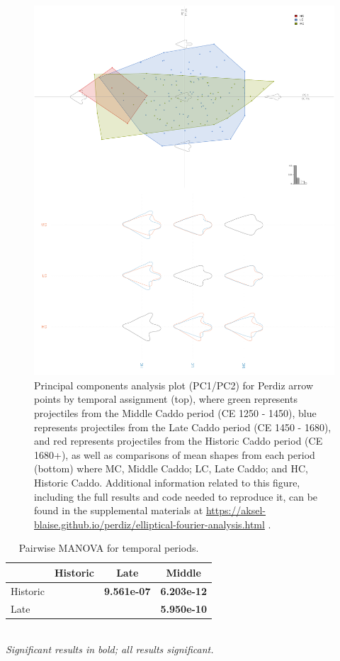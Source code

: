 \documentclass[review]{elsarticle}
\begin{document}
\begin{figure}[!]\centering
\includegraphics[width=0.9\linewidth]{temporal.pdf}
\caption{Principal components analysis plot (PC1/PC2) for Perdiz arrow points by temporal assignment (top), where green represents projectiles from the Middle Caddo period (CE 1250 - 1450), blue represents projectiles from the Late Caddo period (CE 1450 - 1680), and red represents projectiles from the Historic Caddo period (CE 1680+), as well as comparisons of mean shapes from each period (bottom) where MC, Middle Caddo; LC, Late Caddo; and HC, Historic Caddo. Additional information related to this figure, including the full results and code needed to reproduce it, can be found in the supplemental materials at \href{https://aksel-blaise.github.io/perdiz/elliptical-fourier-analysis.html}{https://aksel-blaise.github.io/perdiz/elliptical-fourier-analysis.html} \citep{RN8980}.}
\label{fig:gmtemp}
\end{figure}

\begin{table}[tbh]\centering
\footnotesize
\caption{Pairwise MANOVA for temporal periods.}
\centering
\begin{tabular}{lccc}
\hline
 & Historic & Late & Middle\\
\hline
Historic & & \textbf{9.561e-07} & \textbf{6.203e-12}\\
Late & & & \textbf{5.950e-10}\\
\hline
\end{tabular}\\
\textit{Significant results in bold; all results significant.}
\label{tab:tab.shape.time}
\end{table}
\end{document}
